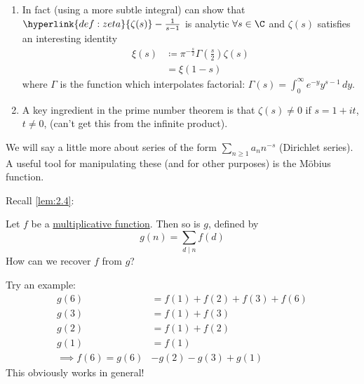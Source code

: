\documentclass{article}
\newenvironment{manual}[1]{%
    \renewcommand\themanualinner{#1}%
    \manualinner
}{\endmanualinner}
\begin{document}
\begin{remark}\leavevmode
    \begin{enumerate}[label=(\roman*)]
        \item In fact (using a more subtle integral) can show that $\hyperlink{def:zeta}{\zeta(s)} - \frac{1}{s-1}$ is analytic $\forall s \in \C$ and $\zeta(s)$ satisfies an interesting identity
            \begin{align*}
                \xi(s) &\coloneqq \pi^{-\frac{s}{2}} \Gamma\left(\frac{s}{2}\right) \zeta(s) \\
                       &=\xi(1-s)
            \end{align*}
            where $\Gamma$ is the function which interpolates factorial: $\Gamma(s) = \int_0^\infty e^{-y} y^{s-1} \, dy$.
        \item A key ingredient in the prime number theorem is that $\zeta(s) \neq 0$ if $s = 1 + it$, $t \neq 0$, (can't get this from the infinite product).
    \end{enumerate}
\end{remark}

We will say a little more about series of the form $\sum_{n \geq 1} a_n n^{-s}$ (Dirichlet series).
A useful tool for manipulating these (and for other purposes) is the M\"obius function.

Recall \cref{lem:2.4}:
\begin{manual}{Lemma 2.4}
    Let $f$ be a \hyperlink{def:multiplicativeFunction}{multiplicative function}. Then so is $g$, defined by \begin{equation*} g(n) = \sum_{d \mid n} f(d) \end{equation*}
\end{manual}
How can we recover $f$ from $g$?
\begin{eg}
    Try an example:
    \begin{align*}
        g(6) &= f(1) + f(2) + f(3) + f(6) \\
        g(3) &= f(1) + f(3) \\
        g(2) &= f(1) + f(2) \\
        g(1) &= f(1) \\
        \implies f(6) = g(6) &- g(2) - g(3) + g(1)
    \end{align*}
    This obviously works in general!
\end{eg}

\end{document}
